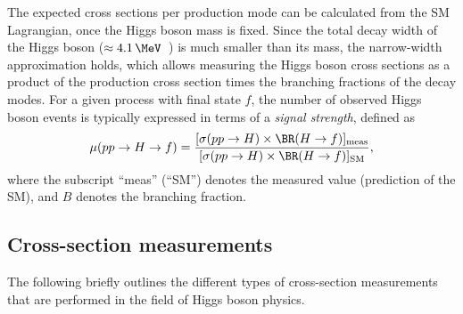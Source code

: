 

The expected cross sections per production mode can be calculated from the SM Lagrangian, once the Higgs boson mass is fixed.
Since the total decay width of the Higgs boson ($\approx 4.1\,\MeV$~\cite{deFlorian:2016spz}) is much smaller than its mass, the narrow-width approximation holds, which allows measuring the Higgs boson cross sections as a product of the production cross section times the branching fractions of the decay modes.
For a given process with final state $f$, the number of observed Higgs boson events is typically expressed in terms of a \emph{signal strength}, defined as 
\begin{equation}
  \label{eq:signal-strength}
  \mu(pp \to H \to f) = \frac{ [ \sigma(pp \to H)  \times \BR(H \to f) ]_\text{meas} } { [ \sigma(pp \to H) \times \BR(H \to f) ]_\text{SM}},
\end{equation}
where the subscript ``meas'' (``SM'') denotes the measured value (prediction of the SM), and $B$ denotes the branching fraction. 

\subsection{Cross-section measurements}
The following briefly outlines the different types of cross-section measurements that are performed in the field of Higgs boson physics. 


